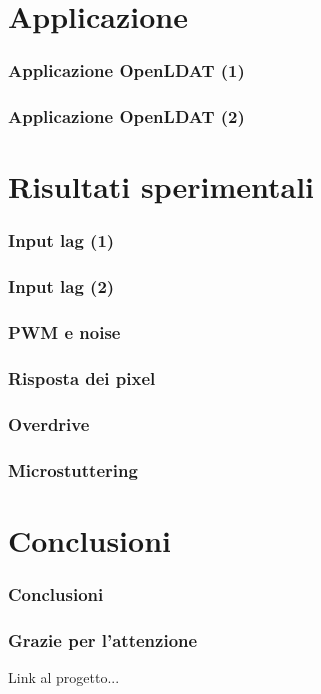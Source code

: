 \documentclass{beamer}
\begin{document}
\section{Applicazione}
\begin{frame}
	\frametitle{Applicazione OpenLDAT (1)}
	\lipsum[1]
\end{frame}
\begin{frame}
	\frametitle{Applicazione OpenLDAT (2)}
	\lipsum[1]
\end{frame}

\section{Risultati sperimentali}
\begin{frame}
	\frametitle{Input lag (1)}
	\lipsum[1]
\end{frame}
\begin{frame}
	\frametitle{Input lag (2)}
	\lipsum[1]
\end{frame}
\begin{frame}
	\frametitle{PWM e noise}
	\lipsum[1]
\end{frame}
\begin{frame}
	\frametitle{Risposta dei pixel}
	\lipsum[1]
\end{frame}
\begin{frame}
	\frametitle{Overdrive}
	\lipsum[1]
\end{frame}
\begin{frame}
	\frametitle{Microstuttering}
	\lipsum[1]
\end{frame}

\section{Conclusioni}
\begin{frame}
	\frametitle{Conclusioni}
	\lipsum[1]
\end{frame}
\begin{frame}
	\frametitle{Grazie per l'attenzione}
	Link al progetto...
\end{frame}
\end{document}
